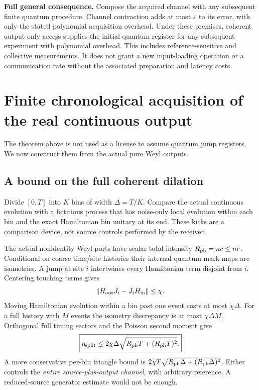 \documentclass[11pt,a4paper]{article}
\newcommand{\norm}[1]{\left\lVert #1\right\rVert}\newcommand{\ket}[1]{\lvert #1\rangle}\newcommand{\bra}[1]{\langle #1\rvert}
\begin{document}
\textbf{Full general consequence.} Compose the acquired channel with any subsequent finite quantum procedure. Channel contraction adds at most $\varepsilon$ to its error, with only the stated polynomial acquisition overhead. Under these premises, coherent output-only access supplies the initial quantum register for any subsequent experiment with polynomial overhead. This includes reference-sensitive and collective measurements. It does not grant a new input-loading operation or a communication rate without the associated preparation and latency costs.

\section{Finite chronological acquisition of the real continuous output}
\label{sec:finite}

The theorem above is not used as a license to assume quantum jump registers. We now construct them from the actual pure Weyl outputs.

\subsection{A bound on the full coherent dilation}

Divide $[0,T]$ into $K$ bins of width $\Delta=T/K$. Compare the actual continuous evolution with a fictitious process that has noise-only local evolution within each bin and the exact Hamiltonian bin unitary at its end. These kicks are a comparison device, not source controls performed by the receiver.

The actual nonidentity Weyl ports have scalar total intensity $R_{\rm ph}=nc\le nr$. Conditional on coarse time/site histories their internal quantum-mark maps are isometries. A jump at site $i$ intertwines every Hamiltonian term disjoint from $i$. Centering touching terms gives
\begin{equation}
\norm{H_{\rm out}J_i-J_iH_{\rm in}}\le\chi.
\end{equation}
Moving Hamiltonian evolution within a bin past one event costs at most $\chi\Delta$. For a full history with $M$ events the isometry discrepancy is at most $\chi\Delta M$. Orthogonal full timing sectors and the Poisson second moment give
\begin{equation}
\boxed{\eta_{\rm split}\le
2\chi\Delta\sqrt{R_{\rm ph}T+(R_{\rm ph}T)^2}.}
\label{eq:globalsplit}
\end{equation}
A more conservative per-bin triangle bound is $2\chi T\sqrt{R_{\rm ph}\Delta+(R_{\rm ph}\Delta)^2}$. Either controls the \emph{entire source-plus-output channel}, with arbitrary reference. A reduced-source generator estimate would not be enough.
\end{document}
